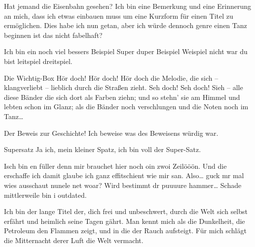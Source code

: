 \documentclass[twocolumn]{article}
\begin{document}
    \blindtext[2]

    \begin{bemerkung}{Hat jemand die Eisenbahn gesehen?}
        Ich bin eine Bemerkung und eine Erinnerung an mich, dass ich etwas einbauen
        muss um eine Kurzform für einen Titel zu ermöglichen. Dies habe ich nun getan, aber ich würde dennoch genre einen Tanz beginnen ist das nicht fabelhaft?
    \end{bemerkung}

    \blindtext

    \begin{beispiel}{Ich bin ein noch viel bessers Beispiel}
        \label{bei:beiref}Super duper Beispiel Weispiel nicht war du bist leitspiel dreitspiel.
    \end{beispiel}

    \blindtext

    \begin{definition*}{Die Wichtig-Box}
        Hör doch! Hör doch! Hör doch die Melodie, die sich -- klangverliebt -- lieblich durch die Straßen zieht. 
        Seh doch! Seh doch! Sieh -- alle diese Bänder die sich dort
        als Farben ziehn; und so stehn' sie am Himmel und lebten
        schon im Glanz; als die Bänder noch verschlungen und
        die Noten noch im Tanz\ldots
    \end{definition*}

    \blindtext

    \begin{beweis}{Der Beweis zur Geschichte!}
        Ich beweise was des Beweisens würdig war.
    \end{beweis}

    \blindtext[1]

    \begin{satz}{Supersatz}
        Ja ich, mein kleiner Spatz, ich bin voll der Super-Satz.
    \end{satz}

    Isch bin en füller denn mir brauchet hier noch oin zwoi Zeilööön.  Und die erschaffe ich damit glaube ich ganz effitschient wie mir san. Also\ldots{} guck mr mal wies ausschaut nunele net woar? Wird bestimmt dr puuuure hammer\ldots
    Schade mittlerweile bin i outdated.
    \begin{definition}{Ich bin der lange Titel der, dich frei und unbeschwert, durch die Welt sich selbst erfährt und heimlich seine Tagen gährt.}
        Man kennt mich als die Dunkelheit, die Petroleum den Flammen zeigt, und in die der Rauch aufsteigt.
        Für mich schlägt die Mitternacht derer Luft die Welt
        vermacht.
    \end{definition}
\end{document}
